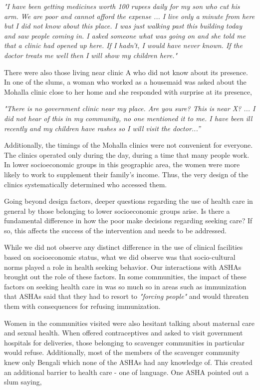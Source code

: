 \textit{"I have been getting medicines worth 100 rupees daily for my son who cut his arm. We are poor and cannot afford the expense ... I live only a minute from here but I did not know about this place. I was just walking past this building today and saw people coming in. I asked someone what was going on and she told me that a clinic had opened up here. If I hadn't, I would have never known. If the doctor treats me well then I will show my children here."}

There were also those living near clinic A who did not know about its presence. In one of the slums, a woman who worked as a housemaid was asked about the Mohalla clinic close to her home and she responded with surprise at its presence,

\textit{"There is no government clinic near my place. Are you sure? This is near X? ... I did not hear of this in my community, no one mentioned it to me. I have been ill recently and my children have rashes so I will visit the doctor...”}

Additionally, the timings of the Mohalla clinics were not convenient for everyone. The clinics operated only during the day, during a time that many people work. In lower socioeconomic groups in this geographic area, the women were more likely to work to supplement their family's income. Thus, the very design of the clinics systematically determined who accessed them.

Going beyond design factors, deeper questions regarding the use of health care in general by those belonging to lower socioeconomic groups arise. Is there a fundamental difference in how the poor make decisions regarding seeking care? If so, this affects the success of the intervention and needs to be addressed.

While we did not observe any distinct difference in the use of clinical facilities based on socioeconomic status, what we did observe was that socio-cultural norms played a role in health seeking behavior. Our interactions with ASHAs brought out the role of these factors. In some communities, the impact of these factors on seeking health care in was so much so in areas such as immunization that ASHAs said that they had to resort to \textit{"forcing people"} and would threaten them with consequences for refusing immunization.

Women in the communities visited were also hesitant talking about maternal care and sexual health. When offered contraceptives and asked to visit government hospitals for deliveries, those belonging to scavenger communities in particular would refuse. Additionally, most of the members of the scavenger community knew only Bengali which none of the ASHAs had any knowledge of. This created an additional barrier to health care - one of language. One ASHA pointed out a slum saying,

